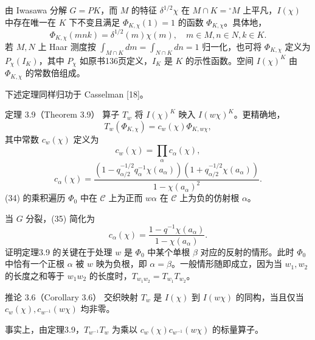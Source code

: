由 Iwasawa 分解 $G=PK$，而 $M$ 的特征 $\delta^{1/2}\chi$ 在 $M\cap K={}^\circ M$ 上平凡，$I(\chi)$ 中存在唯一在 $K$ 下不变且满足 $\Phi_{K,\chi}(1)=1$ 的函数 $\Phi_{K,\chi}$。具体地，
\[
\Phi_{K,\chi}(mnk)=\delta^{1/2}(m)\chi(m),\quad m\in M,n\in N,k\in K.\tag{32}
\]
若 $M,N$ 上 Haar 测度按 $\int_{M\cap K}dm=\int_{N\cap K}dn=1$ 归一化，也可将 $\Phi_{K,\chi}$ 定义为 $P_\chi(I_K)$，其中 $P_\chi$ 如原书136页定义，$I_K$ 是 $K$ 的示性函数。空间 $I(\chi)^K$ 由 $\Phi_{K,\chi}$ 的常数倍组成。

下述定理同样归功于 Casselman [18]。
\begin{originaltheorem}{定理 3.9（Theorem 3.9）}
算子 $T_w$ 将 $I(\chi)^K$ 映入 $I(w\chi)^K$。更精确地，
\[
T_w(\Phi_{K,\chi})=c_w(\chi)\Phi_{K,w\chi},\tag{33}
\]
其中常数 $c_w(\chi)$ 定义为
\[
c_w(\chi)=\prod_\alpha c_\alpha(\chi),\tag{34}
\]
\[
c_\alpha(\chi)=\frac{(1-q_{\alpha/2}^{-1/2}q_\alpha^{-1}\chi(a_\alpha))(1+q_{\alpha/2}^{-1/2}\chi(a_\alpha))}{1-\chi(a_\alpha)^2}.\tag{35}
\]
(34) 的乘积遍历 $\Phi_0$ 中在 $\mathcal C$ 上为正而 $w\alpha$ 在 $\mathcal C$ 上为负的仿射根 $\alpha$。
\end{originaltheorem}
当 $G$ 分裂，(35) 简化为
\[
c_\alpha(\chi)=\frac{1-q^{-1}\chi(a_\alpha)}{1-\chi(a_\alpha)}.\tag{36}
\]
证明定理3.9 的关键在于处理 $w$ 是 $\Phi_0$ 中某个单根 $\beta$ 对应的反射的情形。此时 $\Phi_0$ 中恰有一个正根 $\alpha$ 被 $w$ 映为负根，即 $\alpha=\beta$。一般情形随即成立，因为当 $w_1,w_2$ 的长度之和等于 $w_1w_2$ 的长度时，$T_{w_1w_2}=T_{w_1}T_{w_2}$。
\begin{originaltheorem}{推论 3.6（Corollary 3.6）}
交织映射 $T_w$ 是 $I(\chi)$ 到 $I(w\chi)$ 的同构，当且仅当 $c_w(\chi),c_{w^{-1}}(w\chi)$ 均非零。
\end{originaltheorem}
事实上，由定理3.9，$T_{w^{-1}}T_w$ 为乘以 $c_w(\chi)c_{w^{-1}}(w\chi)$ 的标量算子。

